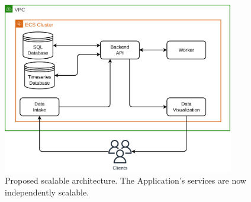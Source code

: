 \begin{figure}[!htbp]
    \centering
    \includegraphics[width=0.90\textwidth]{img/diagrams/pdf/new-arch-scalable.drawio.pdf}
    \caption[New Scalable Architecture]{Proposed scalable architecture. The Application's services are now independently scalable.}
    \label{fig:new-arch-scalable}
\end{figure}

